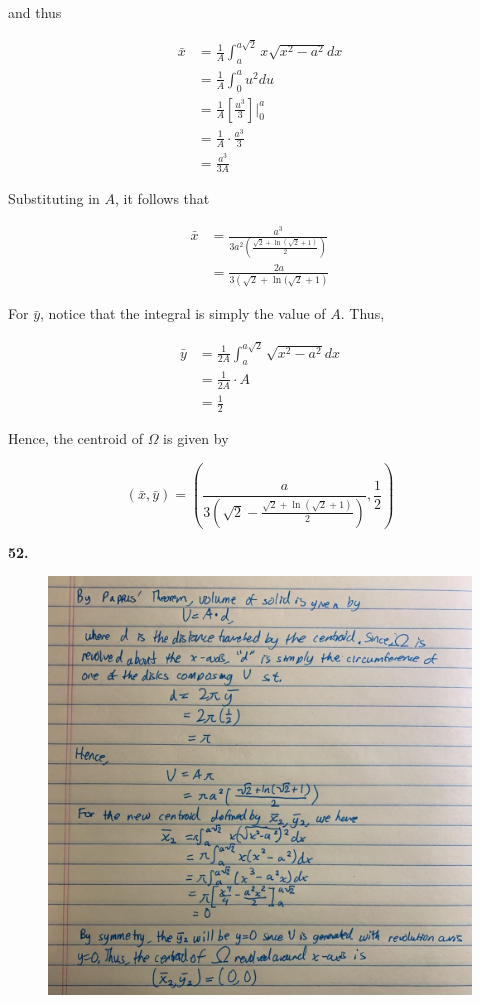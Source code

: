 \documentclass{article}
\begin{document}
    and thus

    \begin{align*}
        \bar{x} &= \frac{1}{A}\int_a^{a\sqrt{2}} x\sqrt{x^2-a^2}dx \\
                &= \frac{1}{A}\int_0^a u^2 du \\
                &= \frac{1}{A}\left[\frac{u^3}{3}\right]\Big|_0^a \\
                &= \frac{1}{A}\cdot\frac{a^3}{3} \\
                &= \frac{a^3}{3A}
    \end{align*}

    Substituting in $A$, it follows that

    \begin{align*}
        \bar{x} &= \frac{a^3}{3a^2 \left(\frac{\sqrt{2}+\ln{\left(\sqrt{2}+1\right)}}{2}\right)} \\
                &= \frac{2a}{3\left(\sqrt{2}+\ln{(\sqrt{2}+1}\right)}
    \end{align*}

    For $\bar{y}$, notice that the integral is simply the value of $A$. Thus,

    \begin{align*}
        \bar{y} &= \frac{1}{2A} \int_a^{a\sqrt{2}} \sqrt{x^2-a^2}dx \\
                &= \frac{1}{2A}\cdot A \\
                &= \frac{1}{2}
    \end{align*}

    Hence, the centroid of $\Omega$ is given by

    \[
        (\bar{x}, \bar{y}) = \left(\frac{a}{3\left(\sqrt{2}-\frac{\sqrt{2} + \ln{\left(\sqrt{2}+1\right)}}{2}\right)}, \frac{1}{2}\right)
    \]

    \pagebreak
    \textbf{52.}

    \begin{figure}[hbt!]
        \centering
        \includegraphics[scale=0.35]{omega4}
    \end{figure}
\end{document}
